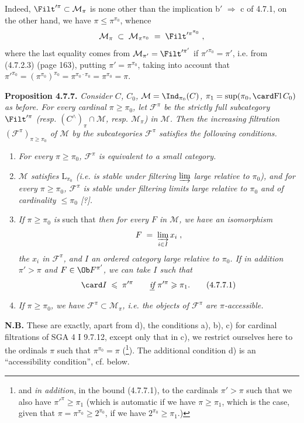Indeed, $\Filt'^{\pi} \subset \mathcal{M}_{\pi}$ is none other than the implication b$'$ $\Longrightarrow$ c of 4.7.1, on the other hand, we have $\pi \leqslant \pi^{\pi_0}$, whence
\[
\mathcal{M}_{\pi} \;\subset\; \mathcal{M}_{\pi^{\pi_0}} \;=\; \Filt'^{\pi^{\pi_0}} \;,
\]
where the last equality comes from $\mathcal{M}_{\pi'} = \Filt'^{\pi'}$ if $\pi'^{\pi_0} = \pi'$, i.e. from (4.7.2.3) (page 163), putting $\pi' = \pi^{\pi_0}$, taking into account that $\pi'^{\pi_0} = (\pi^{\pi_0})^{\pi_0} = \pi^{\pi_0 \cdot \pi_0} = \pi^{\pi_0} = \pi$.

\textbf{Proposition 4.7.7.} \textit{Consider $C$, $C_0$, $\mathcal{M} = \Ind_{\pi_0}(C)$, $\pi_1 = \sup(\pi_0, \card \mathrm{Fl}\, C_0)$ as before. For every cardinal $\pi \geqslant \pi_0$, let $\mathcal{F}^{\pi}$ be the strictly full subcategory} $\Filt'^{\pi}$ \textit{(resp. $(C^{\wedge})_{\pi} \cap \mathcal{M}$, resp. $\mathcal{M}_{\pi}$) in $\mathcal{M}$. Then the increasing filtration $(\mathcal{F}^{\pi})_{\pi \geqslant \pi_0}$ of $\mathcal{M}$ by the subcategories $\mathcal{F}^{\pi}$ satisfies the following conditions.}
\begin{enumerate}
\item[\textit{a)}] \textit{For every $\pi \geqslant \pi_0$, $\mathcal{F}^{\pi}$ is equivalent to a small category.}
\item[\textit{b)}] \textit{$\mathcal{M}$ satisfies $\mathrm{L}_{\pi_0}$ (i.e. is stable under filtering $\varinjlim$ large relative to $\pi_0$), and for every $\pi \geqslant \pi_0$, $\mathcal{F}^{\pi}$ is stable under filtering limits large relative to $\pi_0$ and of cardinality $\leqslant \pi_0$ [?].}
\item[\textit{c)}] \textit{If $\pi \geqslant \pi_0$ is} such that  \textit{then for every $F$ in $\mathcal{M}$, we have an isomorphism}
\[
F \;=\; \varinjlim_{i \in I} x_i \;,
\]
\textit{the $x_i$ in $\mathcal{F}^{\pi}$, and $I$ an ordered category large relative to $\pi_0$. If in addition $\pi' > \pi$ and $F \in \Ob F^{\pi'}$, we can take $I$ such that} %
\[
\card I \;\leqslant\; \pi'^{\pi} \qquad \underline{\textit{if}}\ \pi'^{\pi} \geqslant \pi_1. \tag*{(4.7.7.1)}
\]
\item[\textit{d)}] \textit{If $\pi \geqslant \pi_0$, we have $\mathcal{F}^{\pi} \subset \mathcal{M}_{\pi}$, i.e. the objects of $\mathcal{F}^{\pi}$ are $\pi$-accessible.}
\end{enumerate}
\textbf{N.B.} These are exactly, apart from d), the conditions a), b), c) for cardinal filtrations of SGA 4 I 9.7.12,  except only that in c), we restrict ourselves here to the ordinals $\pi$ such that $\pi^{\pi_0} = \pi$ (\footnote[72]{and \textit{in addition}, in the bound (4.7.7.1), to the cardinals $\pi' > \pi$ such that we also have $\pi'^{\pi} \geqslant \pi_1$ (which is automatic if we have $\pi \geqslant \pi_1$, which is the case, given that $\pi = \pi^{\pi_0} \geqslant 2^{\pi_0}$, if we have $2^{\pi_0} \geqslant \pi_1$.)}). The additional condition d) is an ``accessibility condition'', cf. below.

